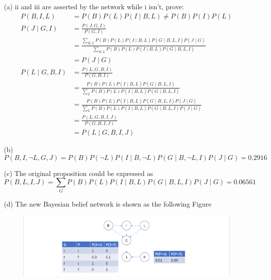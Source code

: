 \documentclass{article}
\begin{document}
(a) ii and iii are asserted by the network while i isn't, prove:
\begin{align*}
    P(B, I, L) &= P(B)P(L)P(I \mid B, L) \ne P(B)P(I)P(L) \\[5mm]
    P(J \mid G, I) &= \frac{P(J, G, I)}{P(G, I)} \\[5mm]
    &= \frac{\sum_{B, L} P(B)P(L)P(I \mid B, L)P(G \mid B, L, I)P(J \mid G)}
            {\sum_{B, L} P(B)P(L)P(I \mid B, L)P(G \mid B, L, I)} \\[5mm]
    &= P(J \mid G) \\[5mm]
    P(L \mid G, B, I) &= \frac{P(L, G, B, I)}{P(G, B, I)} \\[5mm]
    &= \frac{P(B)P(L)P(I \mid B, L)P(G \mid B, L, I)}{\sum_{L} P(B)P(L)P(I \mid B, L)P(G \mid B, L, I)} \\[5mm]
    &= \frac{P(B)P(L)P(I \mid B, L)P(G \mid B, L, I)P(J \mid G)}
    {\sum_{L} P(B)P(L)P(I \mid B, L)P(G \mid B, L, I)P(J \mid G)} \\[5mm]
    &= \frac{P(L, G, B, I, J)}{P(G, B, I, J)} \\[5mm]
    &= P(L \mid G, B, I, J)
\end{align*}

(b)
$$
P(B, I, \neg L, G, J) = P(B)P(\neg L)P(I \mid B, \neg L)P(G \mid B, \neg L, I)P(J \mid G) = 0.2916
$$

(c) The original proposition could be expressed as
$$
P(B, L, I, J) = \sum_{G} P(B)P(L)P(I \mid B, L)P(G \mid B, L, I)P(J \mid G) = 0.06561
$$

(d) The new Bayesian belief network is shown as the following Figure
\begin{figure}[htbp]
\centering
\includegraphics[width=\linewidth]{Bayesian Brief Network.png}
\end{figure}
\end{document}
